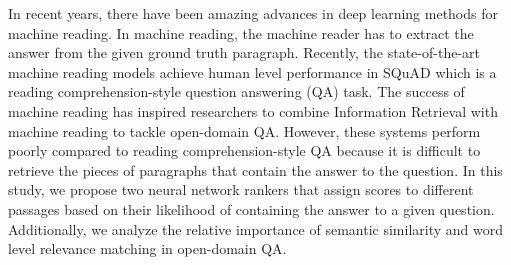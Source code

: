 In recent years, there have been amazing advances in deep learning methods for machine reading. In machine reading, the machine reader has to extract the answer from the given ground truth paragraph. Recently, the state-of-the-art machine reading models achieve human level performance in SQuAD which is a reading comprehension-style question answering (QA) task. The success of machine reading has inspired researchers to combine Information Retrieval with machine reading to tackle open-domain QA. However, these systems perform poorly compared to reading comprehension-style QA because it is difficult to retrieve the pieces of paragraphs that contain the answer to the question. In this study, we propose two neural network rankers that assign scores to different passages based on their likelihood of containing the answer to a given question. Additionally, we analyze the relative importance of semantic similarity and word level relevance matching in open-domain QA.
